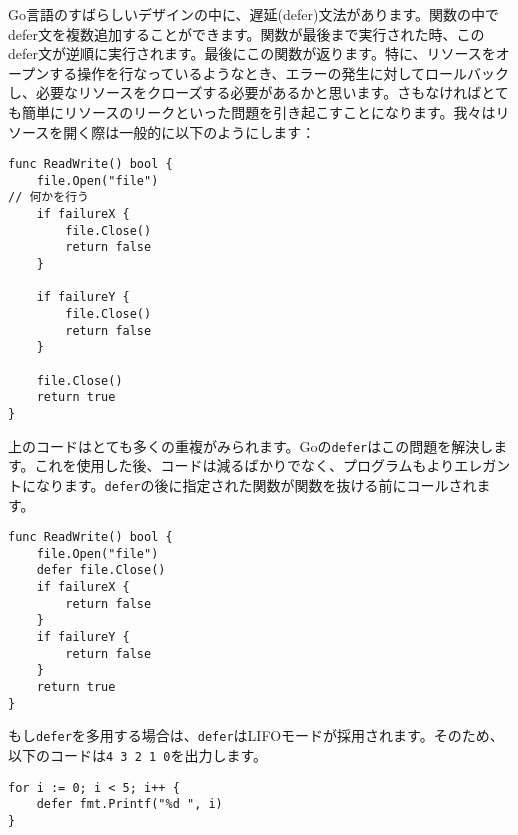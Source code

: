 Go言語のすばらしいデザインの中に、遅延(defer)文法があります。関数の中でdefer文を複数追加することができます。関数が最後まで実行された時、このdefer文が逆順に実行されます。最後にこの関数が返ります。特に、リソースをオープンする操作を行なっているようなとき、エラーの発生に対してロールバックし、必要なリソースをクローズする必要があるかと思います。さもなければとても簡単にリソースのリークといった問題を引き起こすことになります。我々はリソースを開く際は一般的に以下のようにします：

\begin{lstlisting}[numbers=none]
func ReadWrite() bool {
    file.Open("file")
// 何かを行う
    if failureX {
        file.Close()
        return false
    }

    if failureY {
        file.Close()
        return false
    }

    file.Close()
    return true
}
\end{lstlisting}

上のコードはとても多くの重複がみられます。Goの\texttt{defer}はこの問題を解決します。これを使用した後、コードは減るばかりでなく、プログラムもよりエレガントになります。\texttt{defer}の後に指定された関数が関数を抜ける前にコールされます。

\begin{lstlisting}[numbers=none]
func ReadWrite() bool {
    file.Open("file")
    defer file.Close()
    if failureX {
        return false
    }
    if failureY {
        return false
    }
    return true
}
\end{lstlisting}

もし\texttt{defer}を多用する場合は、\texttt{defer}はLIFOモードが採用されます。そのため、以下のコードは\texttt{4 3 2 1 0}を出力します。

\begin{lstlisting}[numbers=none]
for i := 0; i < 5; i++ {
    defer fmt.Printf("%d ", i)
}
\end{lstlisting}

